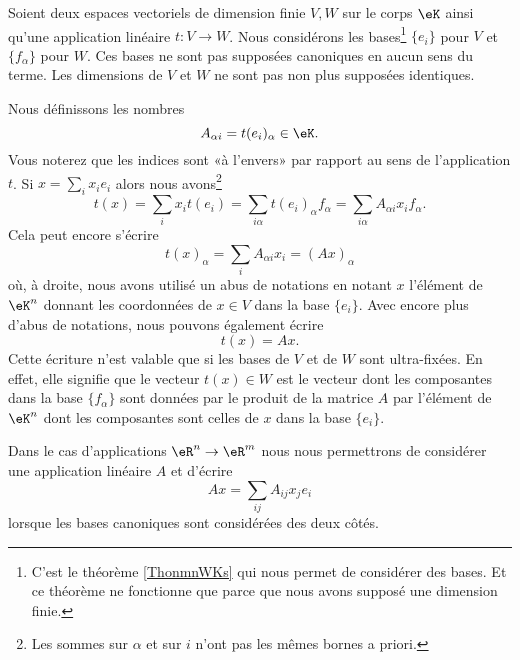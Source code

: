 \begin{normaltext}
    Soient deux espaces vectoriels de dimension finie \( V,W\) sur le corps \( \eK\) ainsi qu'une application linéaire \( t\colon V\to W\). Nous considérons les bases\footnote{C'est le théorème \ref{ThonmnWKs} qui nous permet de considérer des bases. Et ce théorème ne fonctionne que parce que nous avons supposé une dimension finie.} \( \{ e_i \}\) pour \( V\) et \( \{ f_{\alpha} \}\) pour \( W\). Ces bases ne sont pas supposées canoniques en aucun sens du terme. Les dimensions de \( V\) et \( W\) ne sont pas non plus supposées identiques.
    
    Nous définissons les nombres
    \begin{equation}
        A_{\alpha i}=t(e_i)_{\alpha}\in \eK.
    \end{equation}
    Vous noterez que les indices sont «à l'envers» par rapport au sens de l'application \( t\). Si \( x=\sum_ix_ie_i\) alors nous avons\footnote{Les sommes sur \( \alpha\) et sur \( i\) n'ont pas les mêmes bornes a priori.}
    \begin{equation}
        t(x)=\sum_ix_it(e_i)=\sum_{i\alpha}t(e_i)_{\alpha}f_{\alpha}=\sum_{i\alpha}A_{\alpha i}x_if_{\alpha}.
    \end{equation}
    Cela peut encore s'écrire
    \begin{equation}
        t(x)_{\alpha}=\sum_iA_{\alpha i}x_i=(Ax)_{\alpha}
    \end{equation}
    où, à droite, nous avons utilisé un abus de notations en notant \( x\) l'élément de \( \eK^n\) donnant les coordonnées de \( x\in V\) dans la base \( \{ e_i \}\). Avec encore plus d'abus de notations, nous pouvons également écrire
    \begin{equation}
        t(x)=Ax.
    \end{equation}
    Cette écriture n'est valable que si les bases de \( V\) et de \( W\) sont ultra-fixées. En effet, elle signifie que le vecteur \( t(x)\in W\) est le vecteur dont les composantes dans la base \( \{ f_{\alpha} \}\) sont données par le produit de la matrice \( A\) par l'élément de \( \eK^n\) dont les composantes sont celles de \( x\) dans la base \( \{ e_i \}\).
\end{normaltext}

\begin{normaltext}
    Dans le cas d'applications \( \eR^n\to \eR^m\) nous nous permettrons de considérer une application linéaire \( A\) et d'écrire
    \begin{equation}
        Ax=\sum_{ij}A_{ij}x_je_i
    \end{equation}
    lorsque les bases canoniques sont considérées des deux côtés.
\end{normaltext}

